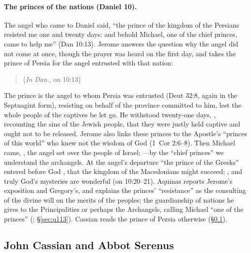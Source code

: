 \paragraph{The princes of the nations (Daniel 10).} The angel who came to
Daniel said, ``the prince of the kingdom of the Persians resisted me one
and twenty days: and behold Michael, one of the chief princes, came to
help me'' (Dan 10:13). Jerome answers the question why the angel did not
come at once, though the prayer was heard on the first day, and takes the
prince of Persia for the angel entrusted with that nation:
\begin{quote}
 (\emph{In Dan.}, on 10:13)
\end{quote}
\noindent The prince is the angel to whom Persia was entrusted (Deut
32:8, again in the Septuagint form), resisting on behalf of the province
committed to him, lest the whole people of the captives be let go. He withstood
twenty-one days, , recounting the sins of the
Jewish people, that they were justly held captive and ought not to be
released. Jerome also
links these princes to the Apostle's ``princes of this world'' who knew
not the wisdom of God (1~Cor 2:6--8). Then Michael came, , the angel set over the people of
Israel; ---by the
``chief princes'' we understand the archangels. At the angel's departure
``the prince of the Greeks'' entered before God , that the kingdom of the Macedonians
might succeed; , and truly God's
mysteries are wonderful (on 10:20--21). Aquinas reports Jerome's
exposition and Gregory's, and explains the princes' ``resistance'' as the
consulting of the divine will on the merits of the peoples; the
guardianship of nations he gives to the Principalities or perhaps the
Archangels, calling Michael ``one of the princes'' (; \S\ref{sec:q113}). Cassian reads the prince of Persia otherwise
(\S\ref{sec:fl-cassian}).

\sectionguard
\subsection{John Cassian and Abbot Serenus}\label{sec:fl-cassian}

